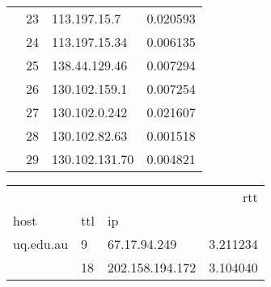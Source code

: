 \begin{center}
\begin{tabular}{lllr}
              & 23 & 113.197.15.7 &  0.020593 \\
              & 24 & 113.197.15.34 &  0.006135 \\
              & 25 & 138.44.129.46 &  0.007294 \\
              & 26 & 130.102.159.1 &  0.007254 \\
              & 27 & 130.102.0.242 &  0.021607 \\
              & 28 & 130.102.82.63 &  0.001518 \\
              & 29 & 130.102.131.70 &  0.004821 \\
\bottomrule
\end{tabular}
\end{center}

\begin{center}
\begin{tabular}{lllr}
\toprule
              &    &                &       rtt \\
host & ttl & ip &           \\
\midrule
uq.edu.au & 9  & 67.17.94.249 &  3.211234 \\
              & 18 & 202.158.194.172 &  3.104040 \\
\bottomrule
\end{tabular}
\end{center}
